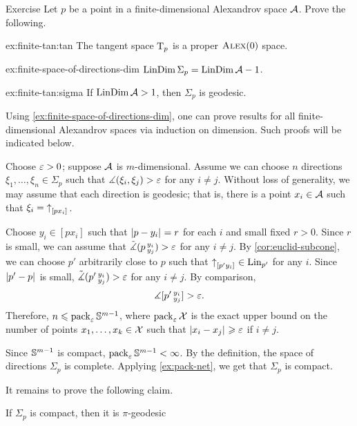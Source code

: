 \begin{thm}{Exercise}\label{ex:finite-tan}
Let $p$ be a point in a finite-dimensional Alexandrov space $\mathcal{A}$.
Prove the following.
\begin{subthm}{ex:finite-tan:tan}
The tangent space $\mathrm{T}_p$ is a proper $\textsc{Alex}(0)$ space.
\end{subthm}

\begin{subthm}{ex:finite-space-of-directions-dim}
$\mathop{\rm LinDim}\nolimits\Sigma_p=\mathop{\rm LinDim}\nolimits\mathcal{A}-1$.
\end{subthm}

\begin{subthm}{ex:finite-tan:sigma}
If $\mathop{\rm LinDim}\nolimits \mathcal{A}>1$, then $\Sigma_p$ is geodesic.
\end{subthm}


\end{thm}

Using \ref{ex:finite-space-of-directions-dim}, one can prove results for all finite-dimensional Alexandrov spaces via induction on  dimension.
Such proofs will be indicated below.

Choose $\varepsilon>0$; suppose $\mathcal{A}$ is $m$-dimensional.
Assume we can choose $n$ directions $\xi_1,\dots, \xi_n\in \Sigma_p$ such that $\measuredangle(\xi_i,\xi_j)>\varepsilon$ for any $i\ne j$.
Without loss of generality, we may assume that each direction is geodesic;
that is, there is a point $x_i\in \mathcal{A}$ such that $\xi_i={\uparrow}_{[{p}{x_i}]_{{}}}$.

Choose $y_i\in [px_i]$ such that $|{p}-{y_i}|_{}^{{}}=r$ for each $i$ and small fixed $r>0$.
Since $r$ is small, we can assume that $\tilde\measuredangle(p\,{}^{y_i}_{y_j})>\varepsilon$ for any $i\ne j$.
By \ref{cor:euclid-subcone}, we can choose $p'$ arbitrarily close to $p$ such that ${\uparrow}_{[{p'}{y_i}]_{{}}}\in \mathop{\rm Lin}\nolimits_{p'}$ for any $i$.
Since  $|{p'}-{p}|_{}^{{}}$ is small, $\tilde\measuredangle(p'\,{}^{y_i}_{y_j})>\varepsilon$ for any $i\ne j$.
By comparison, 
\[\measuredangle [p'\,{}^{y_i}_{y_j}]>\varepsilon.\]
Therefore, $n\leqslant \operatorname{\rm pack}\nolimits_\varepsilon\mathbb{S}^{m-1}$,
where $\operatorname{\rm pack}\nolimits_\varepsilon\mathcal{X}$ is the exact upper bound on the number of points $x_1,\dots,x_k\in \mathcal{X}$ such that $|{x_i}-{x_j}|_{}^{{}}\geqslant\varepsilon$ if $i\ne j$.

Since $\mathbb{S}^{m-1}$ is compact, $\operatorname{\rm pack}\nolimits_\varepsilon\mathbb{S}^{m-1}<\infty$.
By the definition, the space of directions $\Sigma_p$ is complete. 
Applying \ref{ex:pack-net}, we get that  $\Sigma_p$ is compact.

It remains to prove the following claim.

\begin{clm}{}
If $\Sigma_p$ is compact, then it is $\pi$-geodesic
\end{clm}


